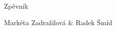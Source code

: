 \useoptex

\load[songbook]

\beginsongbook



\booktitle Zpěvník

\bookauthor Markéta Zadražilová \& Radek Šmíd

\songs





\readtoc

\bye
